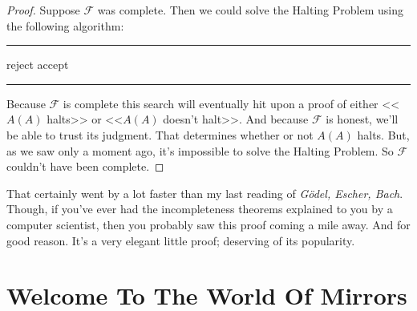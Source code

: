 \documentclass{article}
\newcommand{\F}{\ensuremath{\mathcal{F}}}
\newenvironment{algo}{\begin{samepage}\medskip\hrule\begin{algorithmic}[H]}{\end{algorithmic}\hrule\medskip\end{samepage}}
\begin{document}
\begin{proof}
Suppose $\F$ was complete. Then we could solve the Halting Problem using the following algorithm:
\begin{algo}
      \State reject
    \EndIf
      \State accept
    \EndIf
  \EndFor
\EndFunction
\end{algo}
Because $\F$ is complete this search will eventually hit upon a proof of  either <<$A(A)$ halts>> or <<$A(A)$ doesn't halt>>. And because $\F$ is honest, we'll be able to trust its judgment. That determines whether or not $A(A)$ halts. But, as we saw only a moment ago, it's impossible to solve the Halting Problem. So $\F$ couldn't have been complete. \lightning
\end{proof}

That certainly went by a lot faster than my last reading of \textit{Gödel, Escher, Bach}. Though, if you've ever had the incompleteness theorems explained to you by a computer scientist, then you probably saw this proof coming a mile away. And for good reason. It's a very elegant little proof; deserving of its popularity.

\section{Welcome To The World Of Mirrors}
\end{document}
